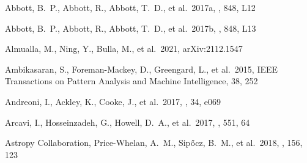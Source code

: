 \documentclass[twocolumn,twocolappendix]{aastex63}
\begin{document}

\begin{thebibliography}{}




 Abbott, B.~P., Abbott, R., Abbott, T.~D., et al.\ 2017a, \aj, 848, L12


 Abbott, B.~P., Abbott, R., Abbott, T.~D., et al.\ 2017b, \apjl, 848, L13









 Almualla, M., Ning, Y., Bulla, M., et al.\ 2021, arXiv:2112.1547



 Ambikasaran, S., Foreman-Mackey, D., Greengard, L., et al.\ 2015, IEEE Transactions on Pattern Analysis and Machine Intelligence, 38, 252




 Andreoni, I., Ackley, K., Cooke, J., et al.\ 2017, \pasa, 34, e069


 Arcavi, I., Hosseinzadeh, G., Howell, D.~A., et al.\ 2017, \nat, 551, 64




 Astropy Collaboration, Price-Whelan, A.~M., Sip{\H{o}}cz, B.~M., et al.\ 2018, \aj, 156, 123



\end{thebibliography}
\end{document}

